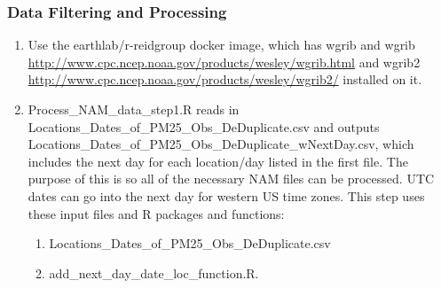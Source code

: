 \subsubsection*{Data Filtering and Processing}

\begin{enumerate}

\item Use the earthlab/r-reidgroup docker image, which has wgrib and wgrib \url{http://www.cpc.ncep.noaa.gov/products/wesley/wgrib.html} and wgrib2 \url{http://www.cpc.ncep.noaa.gov/products/wesley/wgrib2/} installed on it.


\item Process\_NAM\_data\_step1.R reads in Locations\_Dates\_of\_PM25\_Obs\_DeDuplicate.csv and outputs Locations\_Dates\_of\_PM25\_Obs\_DeDuplicate\_wNextDay.csv, which includes the next day for each location/day listed in the first file. The purpose of this is so all of the necessary NAM files can be processed. UTC dates can go into the next day for western US time zones. This step uses these input files and R packages and functions:
	\begin{enumerate}
	\item Locations\_Dates\_of\_PM25\_Obs\_DeDuplicate.csv
	\item add\_next\_day\_date\_loc\_function.R.
	\end{enumerate}
	

\end{enumerate}
